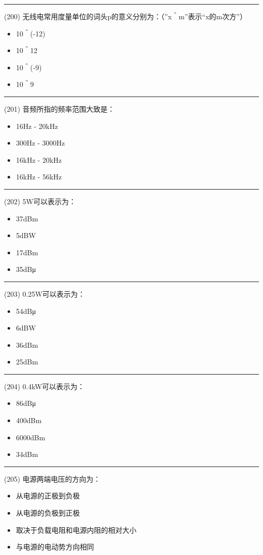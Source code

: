 \documentclass[twocolumn]{ctexart}  %
\begin{document}
\noindent\rule{0.5\textwidth}{1pt}
\heiti (200) 无线电常用度量单位的词头p的意义分别为：（”x＾m”表示“x的m次方”） \songti {\color{gray} [LK0473] }
\begin{itemize}
	\item  10＾(-12)
	\item  10＾12
	\item  10＾(-9)
	\item  10＾9
\end{itemize}


\noindent\rule{0.5\textwidth}{1pt}
\heiti (201) 音频所指的频率范围大致是： \songti {\color{gray} [LK0495] }
\begin{itemize}
	\item  16Hz - 20kHz
	\item  300Hz - 3000Hz
	\item  16kHz - 20kHz
	\item  16kHz - 56kHz
\end{itemize}


\noindent\rule{0.5\textwidth}{1pt}
\heiti (202) 5W可以表示为： \songti {\color{gray} [LK0566] }
\begin{itemize}
	\item  37dBm
	\item  5dBW
	\item  17dBm
	\item  35dBμ
\end{itemize}


\noindent\rule{0.5\textwidth}{1pt}
\heiti (203) 0.25W可以表示为： \songti {\color{gray} [LK0567] }
\begin{itemize}
	\item  54dBμ
	\item  6dBW
	\item  36dBm
	\item  25dBm
\end{itemize}


\noindent\rule{0.5\textwidth}{1pt}
\heiti (204) 0.4kW可以表示为： \songti {\color{gray} [LK0568] }
\begin{itemize}
	\item  86dBμ
	\item  400dBm
	\item  6000dBm
	\item  34dBm
\end{itemize}


\noindent\rule{0.5\textwidth}{1pt}
\heiti (205) 电源两端电压的方向为： \songti {\color{gray} [LK0438] }
\begin{itemize}
	\item  从电源的正极到负极
	\item  从电源的负极到正极
	\item  取决于负载电阻和电源内阻的相对大小
	\item  与电源的电动势方向相同
\end{itemize}
\end{document}
